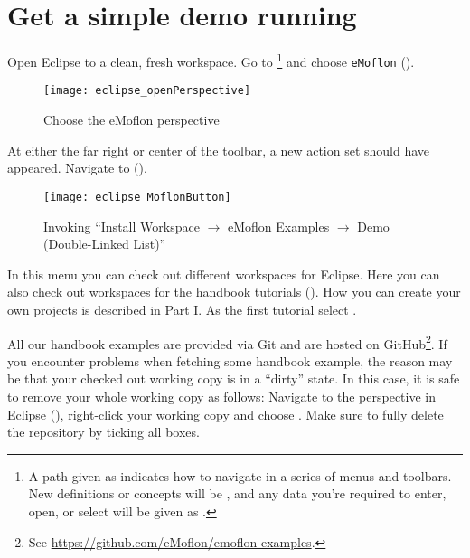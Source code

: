 \newpage
\genHeader

\section{Get a simple demo running}


\begin{stepbystep}
\hypertarget{simpleDemo common}{} 
\item
Open Eclipse to a clean, fresh workspace.
Go to  \footnote{A path given as  indicates how to navigate in a series of menus and toolbars.
New definitions or concepts will be , and any data you're required to enter, open, or select will be given as .} and choose \texttt{eMoflon} ().

\begin{figure}[htbp]
	\centering
  \texttt{[image: eclipse\_openPerspective]}
	\caption{Choose the eMoflon perspective}
	\label{eclipse:openPerspective}
\end{figure} 

\item
At either the far right or center of the toolbar, a new action set should have appeared.
Navigate to  
().
%
\vspace{0.5cm}
\begin{figure}[htbp]
	\centering
  \texttt{[image: eclipse\_MoflonButton]}
	\caption{Invoking \enquote{Install Workspace $\to$ eMoflon Examples $\to$ Demo (Double-Linked List)}}
	\label{eclipse:newMetamodel}
\end{figure}

\item
In this menu you can check out different workspaces for Eclipse. 
Here you can also check out workspaces for the handbook tutorials ().
How you can create your own projects is described in Part I.
As the first tutorial select . 

All our handbook examples are provided via Git and are hosted on GitHub\footnote{See \url{https://github.com/eMoflon/emoflon-examples}.}.
If you encounter problems when fetching some handbook example, the reason may be that your checked out working copy is in a \enquote{dirty} state.
In this case, it is safe to remove your whole working copy as follows:
Navigate to the  perspective in Eclipse (), right-click your working copy  and choose .
Make sure to fully delete the repository by ticking all boxes.


\end{stepbystep}

